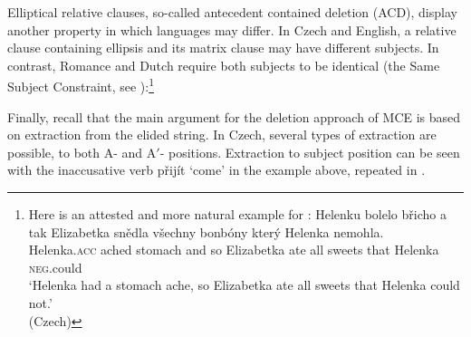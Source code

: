 \documentclass[output=paper,colorlinks,citecolor=brown,
modfonts
]{langscibook}
\begin{document}
\noindent Elliptical relative clauses, so-called antecedent contained deletion (ACD), display another property in which languages may differ. In Czech and English, a relative clause containing ellipsis and its matrix clause may have different subjects. In contrast, Romance and Dutch require both subjects to be identical (the Same Subject Constraint, see ):\footnote{Here is an attested and more natural example for : 
\ea	
\gll Helenku  bolelo břicho a tak  Elizabetka snědla všechny bonbóny který Helenka nemohla.\\
Helenka.\textsc{acc} ached stomach and so Elizabetka ate all sweets that   Helenka \textsc{neg}.could \\
\glt ‘Helenka had a stomach ache, so Elizabetka ate all sweets that Helenka could not.’\\\xspace\hfill (Czech)\z}

\begin{exe}
\ex \label{22}
\begin{xlist}
\end{xlist}
\end{exe}
	
\noindent Finally, recall that the main argument for the deletion approach of MCE is based on extraction from the elided string. In Czech, several types of extraction are possible, to both A- and A$'$- positions. Extraction to subject position can be seen with the inaccusative verb přijít `come' in the example  above, repeated in . 
\end{document}
